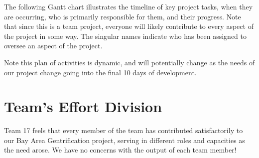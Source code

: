 \documentclass{article}
\begin{document}
The following Gantt chart illustrates the timeline of key project tasks, when they are occurring, who is primarily responsible for them, and their progress. Note that since this is a team project, everyone will likely contribute to every aspect of the project in some way. The singular names indicate who has been assigned to oversee an aspect of the project.



Note this plan of activities is dynamic, and will potentially change as the needs of our project change going into the final 10 days of development.

\section{Team's Effort Division}

Team 17 feels that every member of the team has contributed satisfactorily to our Bay Area Gentrification project, serving in different roles and capacities as the need arose. We have no concerns with the output of each team member!

\nocite{*}


\end{document}
